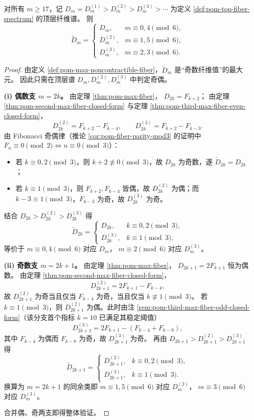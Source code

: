 \begin{theorem}\label{thm:pom-max-noncontractible-fiber-mod6-phase}
对所有 \(m\ge 17\)，记
\(
D_m=D_m^{(1)}>D_m^{(2)}>D_m^{(3)}>\cdots
\)
为定义 \ref{def:pom-top-fiber-spectrum} 的顶层纤维谱。
则
\[
\widetilde D_m=
\begin{cases}
D_m, & m\equiv 0,4\pmod 6,\\[2pt]
D_m^{(2)}, & m\equiv 1,5\pmod 6,\\[2pt]
D_m^{(3)}, & m\equiv 2,3\pmod 6.
\end{cases}
\]
\end{theorem}
\begin{proof}
由定义 \ref{def:pom-max-noncontractible-fiber}，\(\widetilde D_m\) 是“奇数纤维值”的最大元。
因此只需在顶层谱 \(D_m,D_m^{(2)},D_m^{(3)}\) 中判定奇偶。

\textbf{(i) 偶数支 \(m=2k\)。}
由定理 \ref{thm:pom-max-fiber}，
\(
D_{2k}=F_{k+2}
\)；
由定理 \ref{thm:pom-second-max-fiber-closed-form} 与定理 \ref{thm:pom-third-max-fiber-even-closed-form}，
\[
D_{2k}^{(2)}=F_{k+2}-F_{k-4},
\qquad
D_{2k}^{(3)}=F_{k+2}-F_{k-3}.
\]
由 Fibonacci 奇偶律（推论 \ref{cor:pom-fiber-parity-mod3} 的证明中 \(F_n\equiv 0\pmod 2\iff n\equiv 0\pmod 3\)）：
\begin{itemize}
  \item 若 \(k\equiv 0,2\pmod 3\)，则 \(k+2\not\equiv 0\pmod 3\)，故 \(D_{2k}\) 为奇数，遂 \(\widetilde D_{2k}=D_{2k}\)；
  \item 若 \(k\equiv 1\pmod 3\)，则 \(F_{k+2},F_{k-4}\) 皆偶，故 \(D_{2k}^{(2)}\) 为偶；而 \(k-3\equiv 1\pmod 3\)，\(F_{k-3}\) 为奇，故 \(D_{2k}^{(3)}\) 为奇。
\end{itemize}
结合 \(D_{2k}>D_{2k}^{(2)}>D_{2k}^{(3)}\) 得
\[
\widetilde D_{2k}=
\begin{cases}
D_{2k}, & k\equiv 0,2\pmod 3,\\
D_{2k}^{(3)}, & k\equiv 1\pmod 3,
\end{cases}
\]
等价于
\(
m\equiv 0,4\pmod 6
\)
对应 \(D_m\)，
\(
m\equiv 2\pmod 6
\)
对应 \(D_m^{(3)}\)。

\textbf{(ii) 奇数支 \(m=2k+1\)。}
由定理 \ref{thm:pom-max-fiber}，
\(
D_{2k+1}=2F_{k+1}
\)
恒为偶数。
由定理 \ref{thm:pom-second-max-fiber-closed-form}，
\[
D_{2k+1}^{(2)}=2F_{k+1}-F_{k-4},
\]
故 \(D_{2k+1}^{(2)}\) 为奇当且仅当 \(F_{k-4}\) 为奇，当且仅当 \(k\not\equiv 1\pmod 3\)。
若 \(k\equiv 1\pmod 3\)，则 \(D_{2k+1}^{(2)}\) 为偶。此时由注
\ref{rem:pom-third-max-fiber-odd-closed-form}（该分支首个指标 \(k=10\) 已满足其稳定阈值）
\[
D_{2k+1}^{(3)}=2F_{k+1}-(F_{k-4}+F_{k-8}),
\]
其中 \(F_{k-4}\) 为偶而 \(F_{k-8}\) 为奇，故 \(D_{2k+1}^{(3)}\) 为奇。
再由 \(D_{2k+1}>D_{2k+1}^{(2)}>D_{2k+1}^{(3)}\) 得
\[
\widetilde D_{2k+1}=
\begin{cases}
D_{2k+1}^{(2)}, & k\equiv 0,2\pmod 3,\\
D_{2k+1}^{(3)}, & k\equiv 1\pmod 3.
\end{cases}
\]
换算为 \(m=2k+1\) 的同余类即
\(
m\equiv 1,5\pmod 6
\)
对应 \(D_m^{(2)}\)，
\(
m\equiv 3\pmod 6
\)
对应 \(D_m^{(3)}\)。

合并偶、奇两支即得整体验证。
\end{proof}

